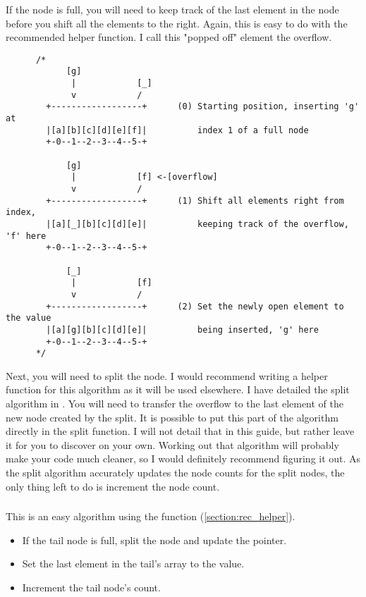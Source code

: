 If the node is full, you will need to keep track of the last element in
the node before you shift all the elements to the right. Again, this is
easy to do with the recommended helper function.
I call this "popped off" element the overflow.

\begin{verbatim}
      /*
            [g]
             |            [_]
             v            /
        +------------------+      (0) Starting position, inserting 'g' at
        |[a][b][c][d][e][f]|          index 1 of a full node
        +-0--1--2--3--4--5-+

            [g]
             |            [f] <-[overflow]
             v            /
        +------------------+      (1) Shift all elements right from index,
        |[a][_][b][c][d][e]|          keeping track of the overflow, 'f' here
        +-0--1--2--3--4--5-+

            [_]
             |            [f]
             v            /
        +------------------+      (2) Set the newly open element to the value
        |[a][g][b][c][d][e]|          being inserted, 'g' here
        +-0--1--2--3--4--5-+
      */
\end{verbatim}

\indent Next, you will need to split the node.
I would recommend writing a helper function for this algorithm as it
will be used elsewhere. I have detailed the split algorithm in .
You will need to transfer the overflow to the last element of the new
node created by the split. It is possible to put this part of the
algorithm directly in the split function. I will not detail that in
this guide, but rather leave it for you to discover on your own.
Working out that algorithm will probably make your code much cleaner,
so I would definitely recommend figuring it out.
As the split algorithm accurately updates the node counts for the split
nodes, the only thing left to do is increment the node count.




\subsubsection{}
\indent This is an easy algorithm using the   function (\ref{section:rec_helper}).

\begin{itemize}
	\item If the tail node is full, split the node and update the  pointer.
	\item Set the last element in the tail's array to the value.
	\item Increment the tail node's count.
\end{itemize}

